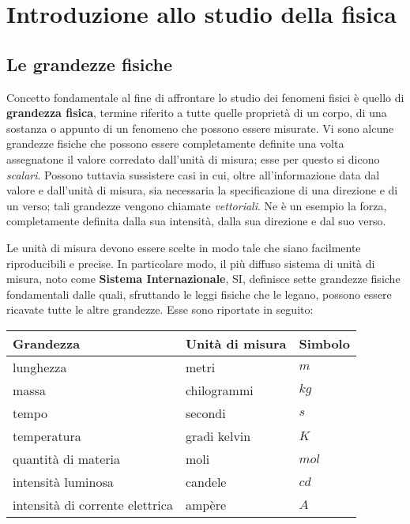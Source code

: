 \chapter{Introduzione allo studio della fisica}

\section{Le grandezze fisiche}

Concetto fondamentale al fine di affrontare lo studio dei fenomeni fisici è quello di \textbf{grandezza fisica}, termine riferito a tutte quelle proprietà di un corpo, di una sostanza o appunto di un fenomeno che possono essere misurate.
Vi sono alcune grandezze fisiche che possono essere completamente definite una volta assegnatone il valore corredato dall'unità di misura; esse per questo si dicono \emph{scalari}. Possono tuttavia sussistere casi in cui, oltre all'informazione data dal valore e dall'unità di misura, sia necessaria la specificazione di una direzione e di un verso; tali grandezze vengono chiamate \emph{vettoriali}. Ne è un esempio la forza, completamente definita dalla sua intensità, dalla sua direzione e dal suo verso.

Le unità di misura devono essere scelte in modo tale che siano facilmente riproducibili e precise. In particolare modo, il più diffuso sistema di unità di misura, noto come \textbf{Sistema Internazionale}, SI, definisce sette grandezze fisiche fondamentali dalle quali, sfruttando le leggi fisiche che le legano, possono essere ricavate tutte le altre grandezze. Esse sono riportate in seguito:

\begin{center}
	\begin{tabular}{lll}
	\toprule
	Grandezza & Unità di misura &Simbolo \\
	\midrule
	lunghezza & metri & $m$ \\
	massa  & chilogrammi & $kg$ \\
	tempo & secondi  & $s$\\
	temperatura &gradi kelvin & $K$\\
	quantità di materia &moli  & $mol$\\
	intensità luminosa  &candele& $cd$ \\
	intensità di corrente elettrica  &ampère & $A$ \\
	\bottomrule
	\end{tabular}
\end{center}

